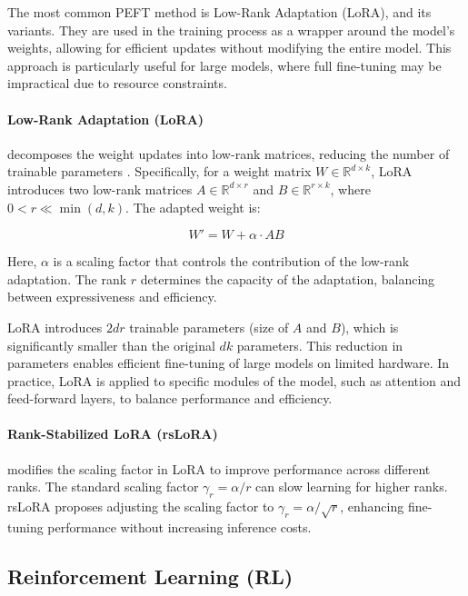 The most common PEFT method is Low-Rank Adaptation (LoRA), and its variants. They are used in the training process as a wrapper around the model's weights, allowing for efficient updates without modifying the entire model. This approach is particularly useful for large models, where full fine-tuning may be impractical due to resource constraints.

\paragraph{Low-Rank Adaptation (LoRA)} decomposes the weight updates into low-rank matrices, reducing the number of trainable parameters \citep{huLoRALowRankAdaptation2021}. Specifically, for a weight matrix \( W \in \mathbb{R}^{d \times k} \), LoRA introduces two low-rank matrices \( A \in \mathbb{R}^{d \times r} \) and \( B \in \mathbb{R}^{r \times k} \), where \( 0 < r \ll \min(d, k) \). The adapted weight is:

\begin{equation}
W' = W + \alpha \cdot A B
\end{equation}

Here, \( \alpha \) is a scaling factor that controls the contribution of the low-rank adaptation. The rank \( r \) determines the capacity of the adaptation, balancing between expressiveness and efficiency.

LoRA introduces \( 2dr \) trainable parameters (size of \( A \) and \( B \)), which is significantly smaller than the original \( dk \) parameters. This reduction in parameters enables efficient fine-tuning of large models on limited hardware. In practice, LoRA is applied to specific modules of the model, such as attention and feed-forward layers, to balance performance and efficiency.

\paragraph{Rank-Stabilized LoRA (rsLoRA)} modifies the scaling factor in LoRA to improve performance across different ranks. The standard scaling factor \( \gamma_r = \alpha / r \) can slow learning for higher ranks. rsLoRA proposes adjusting the scaling factor to \( \gamma_r = \alpha / \sqrt{r} \), enhancing fine-tuning performance without increasing inference costs.

\subsection{Reinforcement Learning (RL)} \label{app:rl}

